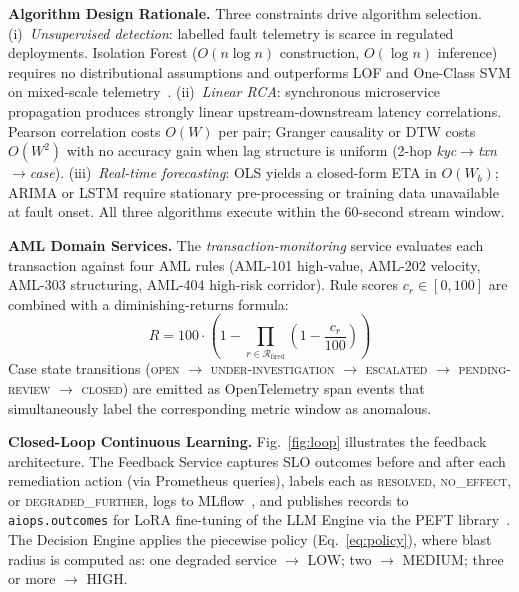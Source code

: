 \documentclass[a4paper]{lipics-v2021}
\newcommand{\mypara}[1]{{\vspace{0.1mm}\noindent\textbf{#1}}}
\begin{document}
\mypara{Algorithm Design Rationale.}
Three constraints drive algorithm selection. (i)~\emph{Unsupervised detection}:
labelled fault telemetry is scarce in regulated deployments. Isolation Forest
($O(n \log n)$ construction, $O(\log n)$ inference) requires no distributional
assumptions and outperforms LOF and One-Class SVM on mixed-scale
telemetry~\cite{liu2012isolation}. (ii)~\emph{Linear RCA}: synchronous microservice
propagation produces strongly linear upstream-downstream latency correlations. Pearson
correlation costs $O(W)$ per pair; Granger causality or DTW costs $O(W^2)$ with no
accuracy gain when lag structure is uniform (2-hop \textit{kyc}$\to$\textit{txn}$\to$\textit{case}).
(iii)~\emph{Real-time forecasting}: OLS yields a closed-form ETA in $O(W_b)$;
ARIMA or LSTM require stationary pre-processing or training data unavailable at
fault onset. All three algorithms execute within the 60-second stream window.

\mypara{AML Domain Services.}
The \textit{transaction-monitoring} service evaluates each transaction against four
AML rules (AML-101 high-value, AML-202 velocity, AML-303 structuring, AML-404
high-risk corridor). Rule scores $c_r \in [0, 100]$ are combined with a
diminishing-returns formula:
\begin{equation}
    R = 100 \cdot \left(1 - \prod_{r \in \mathcal{R}_{\text{fired}}}
    \left(1 - \frac{c_r}{100}\right)\right)
    \label{eq:aml}
\end{equation}
Case state transitions (\textsc{open} $\to$ \textsc{under-investigation} $\to$
\textsc{escalated} $\to$ \textsc{pending-review} $\to$ \textsc{closed}) are emitted
as OpenTelemetry span events that simultaneously label the corresponding metric
window as anomalous.

\mypara{Closed-Loop Continuous Learning.}
Fig.~\ref{fig:loop} illustrates the feedback architecture. The Feedback Service
captures SLO outcomes before and after each remediation action (via Prometheus
queries), labels each as \textsc{resolved}, \textsc{no\_effect}, or
\textsc{degraded\_further}, logs to MLflow~\cite{mlflow2018}, and publishes records
to \texttt{aiops.outcomes} for LoRA fine-tuning of the LLM Engine via the PEFT
library~\cite{peft2022}. The Decision Engine applies the piecewise policy
(Eq.~\ref{eq:policy}), where blast radius is computed as: one degraded service $\to$
LOW; two $\to$ MEDIUM; three or more $\to$ HIGH.
\end{document}
